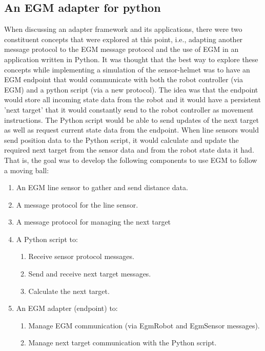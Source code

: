 \documentclass{cslthse-msc}
\begin{document}
\subsection{An EGM adapter for python}
\label{sec:Dev:I2:python_adapter}
When discussing an adapter framework and its applications, there were two constituent concepts that were explored at this point, i.e., adapting another message protocol to the EGM message protocol and the use of EGM in an application written in Python. It was thought that the best way to explore these concepts while implementing a simulation of the sensor-helmet was to have an EGM endpoint that would communicate with both the robot controller (via EGM) and a python script (via a new protocol). The idea was that the endpoint would store all incoming state data from the robot and it would have a persistent 'next target' that it would constantly send to the robot controller as movement instructions. The Python script would be able to send updates of the next target as well as request current state data from the endpoint. When line sensors would send position data to the Python script, it would calculate and update the required next target from the sensor data and from the robot state data it had. That is, the goal was to develop the following components to use EGM to follow a moving ball:
\begin{enumerate}
    \item An EGM line sensor to gather and send distance data.
    \item A message protocol for the line sensor.
    \item A message protocol for managing the next target
    \item A Python script to:
        \begin{enumerate}
            \item Receive sensor protocol messages.
            \item Send and receive next target messages.
            \item Calculate the next target.
        \end{enumerate}
    \item An EGM adapter (endpoint) to:
        \begin{enumerate}
            \item Manage EGM communication (via EgmRobot and EgmSensor messages).
            \item Manage next target communication with the Python script.
        \end{enumerate}
\end{enumerate}
\end{document}
